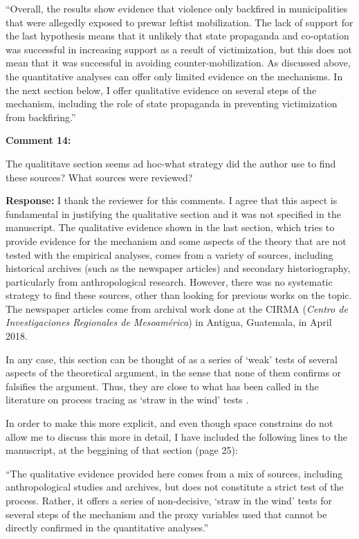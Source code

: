 \documentclass[12pt, a4paper, notitlepage]{article}
\begin{document}
``Overall, the results show evidence that violence only backfired in municipalities that were allegedly exposed to prewar leftist mobilization.
The lack of support for the last hypothesis means that it unlikely that state propaganda and co-optation was successful in increasing support as a result of victimization, but this does not mean that it was successful in avoiding counter-mobilization.
As discussed above, the quantitative analyses can offer only limited evidence on the mechanisms.
In the next section below, I offer qualitative evidence on several steps of the mechanism, including the role of state propaganda in preventing victimization from backfiring.''

\vspace{15pt}
\noindent\textbf{Comment 14:}
\begin{displayquote}
The qualititave section seems ad hoc-what strategy did the author use to find these sources? What sources were reviewed?
\end{displayquote}


\noindent\textbf{Response:} I thank the reviewer for this comments. I agree that this aspect is fundamental in justifying the qualitative section and it was not specified in the manuscript. The qualitative evidence shown in the last section, which tries to provide evidence for the mechanism and some aspects of the theory that are not tested with the empirical analyses, comes from a variety of sources, including historical archives (such as the newspaper articles) and secondary historiography, particularly from anthropological research. However, there was no systematic strategy to find these sources, other than looking for previous works on the topic. The newspaper articles come from archival work done at the CIRMA (\textit{Centro de Investigaciones Regionales de Mesoamérica}) in Antigua, Guatemala, in April 2018.

In any case, this section can be thought of as a series of `weak' tests of several aspects of the theoretical argument, in the sense that none of them confirms or falsifies the argument. Thus, they are close to what has been called in the literature on process tracing as `straw in the wind' tests \citep{Collier:2011ve}.

In order to make this more explicit, and even though space constrains do not allow me to discuss this more in detail, I have included the following lines to the manuscript, at the beggining of that section (page 25):

``The qualitative evidence provided here comes from a mix of sources, including anthropological studies and archives, but does not constitute a strict test of the process.
Rather, it offers a series of non-decisive, `straw in the wind' tests \citep{Collier:2011ve} for several steps of the mechanism and the proxy variables used that cannot be directly confirmed in the quantitative analyses.''

\newpage


\end{document}
